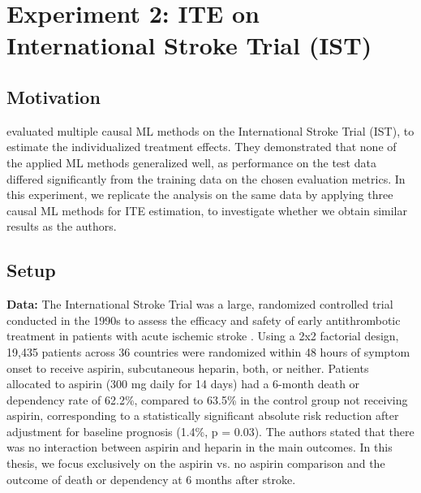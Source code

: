 







\chapter{Experiment 2: ITE on International Stroke Trial (IST)}





\section{Motivation}





% 
% 
\citet{chen2025} evaluated multiple causal ML methods on the International Stroke Trial (IST), to estimate the individualized treatment effects. They demonstrated that none of the applied ML methods generalized well, as performance on the test data differed significantly from the training data on the chosen evaluation metrics.
In this experiment, we replicate the analysis on the same data by applying three causal ML methods for ITE estimation, to investigate whether we obtain similar results as the authors.


\section{Setup} \label{sec:methods_experiment2}



\textbf{Data:} The International Stroke Trial was a large, randomized controlled trial conducted in the 1990s to assess the efficacy and safety of early antithrombotic treatment in patients with acute ischemic stroke \citep{IST1997}. Using a 2x2 factorial design, 19,435 patients across 36 countries were randomized within 48 hours of symptom onset to receive aspirin, subcutaneous heparin, both, or neither. Patients allocated to aspirin (300 mg daily for 14 days) had a 6-month death or dependency rate of 62.2\%, compared to 63.5\% in the control group not receiving aspirin, corresponding to a statistically significant absolute risk reduction after adjustment for baseline prognosis (1.4\%, p = 0.03). The authors stated that there was no interaction between aspirin and heparin in the main outcomes. In this thesis, we focus exclusively on the aspirin vs. no aspirin comparison and the outcome of death or dependency at 6 months after stroke.


